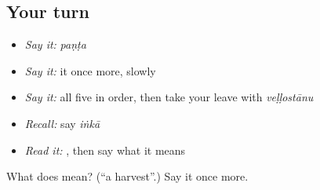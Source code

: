 \subsection*{Your turn}
\begin{itemize}
\raggedright
  \item \emph{Say it:} \emph{paṇṭa}
  \item \emph{Say it:} it once more, slowly
  \item \emph{Say it:} all five in order, then take your leave with \emph{veḷḷostānu}
  \item \emph{Recall:} say \emph{iṅkā}
  \item \emph{Read it:} \textbf{}, then say what it means
\end{itemize}

\begin{tcolorbox}[breakable,colback=teal!4,colframe=teal!35!black,title={Before you move on}]
What does  mean? (\textquotedblleft{}a harvest\textquotedblright{}.) Say it once more.
\end{tcolorbox}
